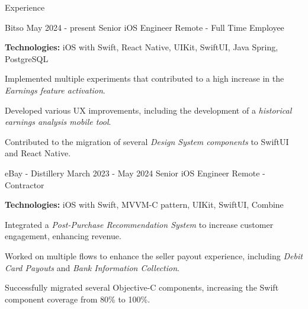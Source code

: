 \documentclass{curriculum}
\begin{document}

\begin{cvsection}{Experience}


    \makesectionitemheader
        {Bitso}                     {May 2024 - present}
        {Senior iOS Engineer}       {Remote - Full Time Employee}

        \begin{sectionitemlist}
        \item{
                \textbf{Technologies:} iOS with Swift, React Native, UIKit, SwiftUI, Java Spring, PostgreSQL
            }
        \item{
                Implemented multiple experiments that contributed to a high increase in the \textit{Earnings feature activation}.
            }
        \item{
                Developed various UX improvements, including the development of a \textit{historical earnings analysis mobile tool}.
            }
        \item{
                Contributed to the migration of several \textit{Design System components} to SwiftUI and React Native.
            }
        \end{sectionitemlist}


    \makesectionitemheader
        {eBay - Distillery}         {March 2023 - May 2024}
        {Senior iOS Engineer}       {Remote - Contractor}

        \begin{sectionitemlist}
        \item{
            \textbf{Technologies:} iOS with Swift, MVVM-C pattern, UIKit, SwiftUI, Combine
        }
        \item{
            Integrated a \textit{Post-Purchase Recommendation System} to increase customer engagement, enhancing revenue.
        }
        \item{
            Worked on multiple flows to enhance the seller payout experience, including \textit{Debit Card Payouts} and \textit{Bank Information Collection}.
        }
        \item{
            Successfully migrated several Objective-C components, increasing the Swift component coverage from 80\% to 100\%.
        }
        \end{sectionitemlist}


\end{cvsection}
\end{document}
